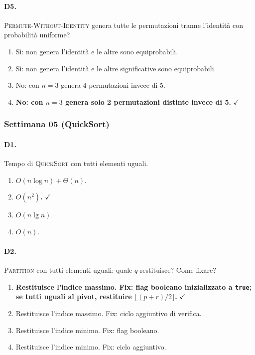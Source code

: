 \paragraph{D5.} \textsc{Permute-Without-Identity} genera tutte le permutazioni tranne l'identit\`a con probabilit\`a uniforme?
\begin{enumerate}[label=\Alph*.,leftmargin=*]
	\item S\`i: non genera l'identit\`a e le altre sono equiprobabili.
	\item S\`i: non genera l'identit\`a e le altre significative sono equiprobabili.
	\item No: con $n=3$ genera 4 permutazioni invece di 5.
	\item \textcolor{correctgreen}{\textbf{No: con $n=3$ genera solo 2 permutazioni distinte invece di 5.}} \hfill\textcolor{correctgreen}{$\checkmark$}
\end{enumerate}

\subsubsection{Settimana 05 (QuickSort)}

\paragraph{D1.} Tempo di \textsc{QuickSort} con tutti elementi uguali.
\begin{enumerate}[label=\Alph*.,leftmargin=*]
	\item $O(n\log n) + \Theta(n)$.
	\item \textcolor{correctgreen}{\textbf{$O(n^2)$.}} \hfill\textcolor{correctgreen}{$\checkmark$}
	\item $O(n\lg n)$.
	\item $O(n)$.
\end{enumerate}

\paragraph{D2.} \textsc{Partition} con tutti elementi uguali: quale $q$ restituisce? Come fixare?
\begin{enumerate}[label=\Alph*.,leftmargin=*]
	\item \textcolor{correctgreen}{\textbf{Restituisce l'indice massimo. Fix: flag booleano inizializzato a \texttt{true}; se tutti uguali al pivot, restituire $\lfloor(p+r)/2\rfloor$.}} \hfill\textcolor{correctgreen}{$\checkmark$}
	\item Restituisce l'indice massimo. Fix: ciclo aggiuntivo di verifica.
	\item Restituisce l'indice minimo. Fix: flag booleano.
	\item Restituisce l'indice minimo. Fix: ciclo aggiuntivo.
\end{enumerate}

